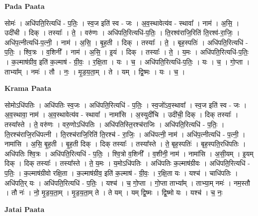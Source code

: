 \documentclass[17pt]{extarticle}
\begin{document}
\textbf{Pada Paata} \newline

सोमः॑ । अधि॑पति॒रित्यधि॑ - प॒तिः॒ । स्व॒ज इति॑ स्व - जः । अ॒व॒स्थावेत्य॑व - स्थावा᳚ । नाम॑ । अ॒सि॒ । उदी॑ची । दिक् । तस्याः᳚ । ते॒ । वरु॑णः । अधि॑पति॒रित्यधि॑-प॒तिः॒ । ति॒रश्व॑राजि॒रिति॑ ति॒रश्व॑-रा॒जिः॒ । अधि॑प॒त्नीत्यधि॑-प॒त्नी॒ । नाम॑ । अ॒सि॒ । बृ॒ह॒ती । दिक् । तस्याः᳚ । ते॒ । बृह॒स्पतिः॑ । अधि॑पति॒रित्यधि॑ - प॒तिः॒ । श्वि॒त्रः । व॒शिनी᳚ । नाम॑ । अ॒सि॒ । इ॒यं । दिक् । तस्याः᳚ । ते॒ । य॒मः । अधि॑पति॒रित्यधि॑-प॒तिः॒ । क॒ल्माष॑ग्रीव॒ इति॑ क॒ल्माष॑ - ग्री॒वः॒ । र॒क्षि॒ता । यः । च॒ । अधि॑पति॒रित्यधि॑-प॒तिः॒ । यः । च॒ । गो॒प्ता । ताभ्या᳚म् । नमः॑ । तौ । नः॒ । मृ॒ड॒य॒ता॒म् । ते । यम् । द्वि॒ष्मः । यः । च॒ ।  \newline


\textbf{Krama Paata} \newline

सोमोऽधि॑पतिः । अधि॑पतिः स्व॒जः । अधि॑पति॒रित्यधि॑ - प॒तिः॒ । स्व॒जो॑ऽव॒स्थावा᳚ । स्व॒ज इति॑ स्व - जः । अ॒व॒स्थावा॒ नाम॑ । अ॒व॒स्थावेत्य॑व - स्थावा᳚ । नामा॑सि । अ॒स्युदी॑चि । उदी॑ची॒ दिक् । दिक् तस्याः᳚ । तस्या᳚स्ते । ते॒ वरु॑णः । वरु॒णोऽधि॑पतिः । अधि॑पतिस्ति॒रश्च॑राजिः । अधि॑पति॒रित्यधि॑ - प॒तिः॒ । ति॒रश्च॑राजि॒रधि॑पत्नी । ति॒रश्च॑राजि॒रिति॑ ति॒रश्च॑ - रा॒जिः॒ । अधि॑पत्नी॒ नाम॑ । अधि॑प॒त्नीत्यधि॑ - प॒त्नी॒ । नामा॑सि । अ॒सि॒ बृ॒ह॒ती । बृ॒ह॒ती दिक् । दिक् तस्याः᳚ । तस्या᳚स्ते । ते॒ बृह॒स्पतिः॑ । बृह॒स्पति॒रधि॑पतिः । अधि॑पतिः श्वि॒त्रः । अधि॑पति॒रित्यधि॑ - प॒तिः॒ । श्वि॒त्रो व॒शिनी᳚ । व॒शीनी॒ नाम॑ । नामा॑सि । अ॒सी॒यम् । इ॒यम् दिक् । दिक् तस्याः᳚ । तस्या᳚स्ते । ते॒ य॒मः । य॒मोऽधि॑पतिः । अधि॑पतिः क॒ल्माष॑ग्रीवः । अधि॑पति॒रित्यधि॑ - प॒तिः॒ । क॒ल्माष॑ग्रीवो रक्षि॒ता । क॒ल्माष॑ग्रीव॒ इति॑ क॒ल्माष॑ - ग्री॒वः॒ । र॒क्षि॒ता यः । यश्च॑ । चाधि॑पतिः । अधि॑पति॒र् यः । अधि॑पति॒रित्यधि॑ - प॒तिः॒ । यश्च॑ । च॒ गो॒प्ता । गो॒प्ता ताभ्या᳚म् । ताभ्या॒म् नमः॑ । नम॒स्तौ । तौ नः॑ । नो॒ मृ॒ड॒य॒ता॒म् । मृ॒ड॒य॒ता॒म् ते । ते यम् । यम् द्वि॒ष्मः । द्वि॒ष्मो यः । यश्च॑ । च॒ नः॒ \newline

\textbf{Jatai Paata} \newline
\end{document}
